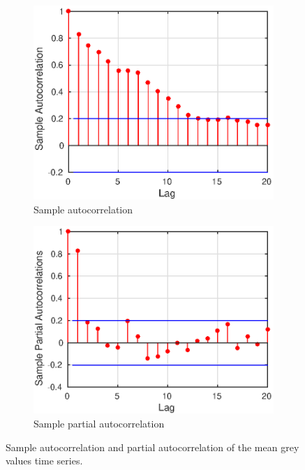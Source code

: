 \documentclass[12pt]{report}
\begin{document}
\begin{figure}
	\centering
	\begin{subfigure}[b]{0.45\textwidth}
		\includegraphics[width=1\textwidth]{figures/initial_acf.eps}
		\caption{Sample autocorrelation}
	\end{subfigure}
	\begin{subfigure}[b]{0.45\textwidth}
		\includegraphics[width=1\textwidth]{figures/initial_pacf.eps}
		\caption{Sample partial autocorrelation}
	\end{subfigure}
	\caption{Sample autocorrelation and partial autocorrelation of the mean grey values time series.}
	\label{fig:timeSeries_acf_pacf}
\end{figure}
\end{document}
